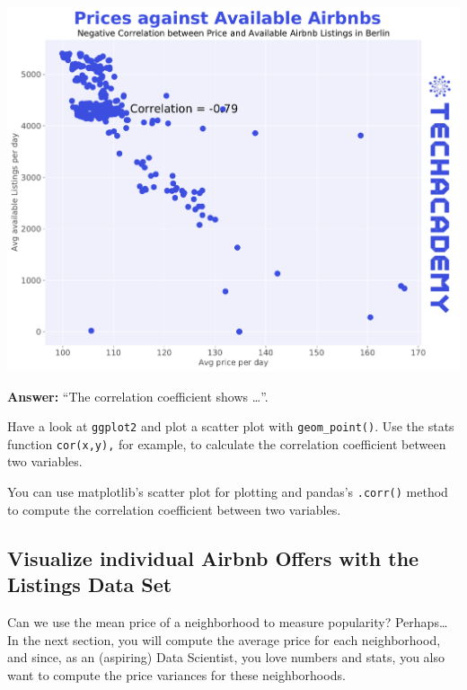 \documentclass[
  11pt,
]{article}
\newenvironment{tips}[1]
  {
  \begin{itemize}
  \footnotesize
  \renewcommand{\labelitemi}{
    \raisebox{-.7\height}[0pt][0pt]{
      {\setkeys{Gin}{width=3em,keepaspectratio}
        \texttt{[image: images/\#1.png]}}
    }
  }
  \setlength{\fboxsep}{1em}
  \begin{rbox}
  \item
  }
  {
  \end{rbox}
  \end{itemize}
  }
\newenvironment{tipsp}[1]
  {
  \begin{itemize}
  \footnotesize
  \renewcommand{\labelitemi}{
    \raisebox{-.7\height}[0pt][0pt]{
      {\setkeys{Gin}{width=3em,keepaspectratio}
        \texttt{[image: images/\#1.png]}}
    }
  }
  \setlength{\fboxsep}{1em}
  \begin{pbox}
  \item
  }
  {
  \end{pbox}
  \end{itemize}
  }
\begin{document}
\begin{center}\includegraphics[width=1\linewidth]{plot/01_python/corr_availability_price} \end{center}

\textbf{Answer:} ``The correlation coefficient shows \ldots{}''.

\begin{tips}r
Have a look at \texttt{ggplot2} and plot a scatter plot with \texttt{geom\_point()}.
Use the stats function \texttt{cor(x,y),} for example, to calculate the correlation coefficient between two variables.

\end{tips}

\begin{tipsp}p
You can use matplotlib's scatter plot for plotting and pandas's \texttt{.corr()} method to compute the correlation coefficient between two variables.

\end{tipsp}

\hypertarget{visualize-individual-airbnb-offers-with-the-listings-data-set}{%
\subsection{Visualize individual Airbnb Offers with the Listings Data Set}\label{visualize-individual-airbnb-offers-with-the-listings-data-set}}

Can we use the mean price of a neighborhood to measure popularity?
Perhaps\ldots{} In the next section, you will compute the average price for each neighborhood, and since, as an (aspiring) Data Scientist, you love numbers and stats, you also want to compute the price variances for these neighborhoods.
\end{document}
